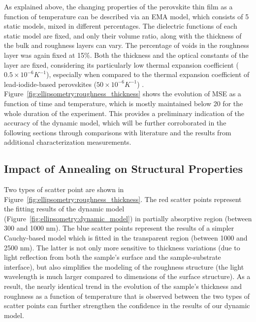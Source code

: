 As explained above, the changing properties of the perovskite thin film as a function of temperature can be described via an EMA model, which consists of 5 static models, mixed in different percentages. The dielectric functions of each static model are fixed, and only their volume ratio, along with the thickness of the bulk and roughness layers can vary. The percentage of voids in the roughness layer was again fixed at 15\%. Both the thickness and the optical constants of the  layer are fixed, considering its particularly low thermal expansion coefficient ($0.5 \times 10^{-6} K^{-1}$), especially when compared to the thermal expansion coefficient of lead-iodide-based perovskites ($50\times10^{-6} K^{-1}$) \cite{Steele2019ThermalFilms}. Figure~\ref{fig:ellipsometry:roughness_thickness} shows the evolution of MSE as a function of time and temperature, which is mostly maintained below 20 for the whole duration of the experiment. This provides a preliminary indication of the accuracy of the dynamic model, which will be further corroborated in the following sections through comparisons with literature and the results from additional characterization measurements. 

\subsection{Impact of Annealing on Structural Properties}

Two types of scatter point are shown in Figure~\ref{fig:ellipsometry:roughness_thickness}. The red scatter points represent the fitting results of the dynamic model (Figure~\ref{fig:ellipsometry:dynamic_model}) in partially absorptive region (between 300 and 1000 nm). The blue scatter points represent the results of a simpler Cauchy-based model which is fitted in the transparent region (between 1000 and 2500 nm). The latter is not only more sensitive to thickness variations (due to light reflection from both the sample's surface and the sample-substrate interface),
but also simplifies the modeling of the roughness structure (the light wavelength is much larger compared to dimensions of the surface structure). As a result, the nearly identical trend in the evolution of the sample's thickness and roughness as a function of temperature that is observed between the two types of scatter points can further strengthen the confidence in the results of our dynamic model. 


